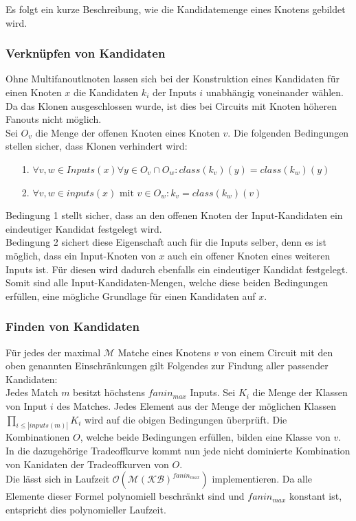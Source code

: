 \documentclass[11pt, a4paper, german]{article}
\begin{document}
Es folgt ein kurze Beschreibung, wie die Kandidatemenge eines Knotens gebildet wird.

\subsubsection{Verknüpfen von Kandidaten}
\label{subsubsec:verknuepfen_kandidaten}
Ohne Multifanoutknoten lassen sich bei der Konstruktion eines Kandidaten für einen Knoten $x$ die Kandidaten $k_i$ der Inputs $i$ unabhängig voneinander wählen.
Da das Klonen ausgeschlossen wurde, ist dies bei Circuits mit Knoten höheren Fanouts nicht möglich.\\
Sei $O_v$ die Menge der offenen Knoten eines Knoten $v$.
Die folgenden Bedingungen stellen sicher, dass Klonen verhindert wird: \\
\begin{itemize}
	\item[1.] $\forall v,w \in Inputs(x) \forall y \in O_v \cap O_w : class(k_v)(y) = class(k_w)(y)$
	\item[2.] $\forall v,w \in inputs(x) \text{ mit } v \in O_w : k_v = class(k_w)(v)$
\end{itemize}
Bedingung 1 stellt sicher, dass an den offenen Knoten der Input-Kandidaten ein eindeutiger Kandidat festgelegt wird.\\ Bedingung 2 sichert diese Eigenschaft auch für die Inputs selber, denn es ist möglich, dass ein Input-Knoten von $x$ auch ein offener Knoten eines weiteren Inputs ist. Für diesen wird dadurch ebenfalls ein eindeutiger Kandidat festgelegt. \\
Somit sind alle Input-Kandidaten-Mengen, welche diese beiden Bedingungen erfüllen, eine mögliche Grundlage für einen Kandidaten auf $x$. 

\subsubsection{Finden von Kandidaten} 
Für jedes der maximal $\mathcal{M}$ Matche eines Knotens $v$ von einem Circuit mit den oben genannten Einschränkungen gilt Folgendes zur Findung aller passender Kandidaten:\\

Jedes Match $m$ besitzt höchstens $fanin_{max}$ Inputs. Sei $K_i$ die Menge der Klassen von Input $i$ des Matches. Jedes Element aus der Menge der möglichen Klassen $\prod_{i\leq |inputs(m)|} K_i $ wird auf die obigen Bedingungen überprüft. Die Kombinationen $O$, welche beide Bedingungen erfüllen, bilden eine Klasse von $v$. In die  dazugehörige Tradeoffkurve kommt nun jede nicht dominierte Kombination von Kanidaten der Tradeoffkurven von $O$. \\
Die lässt sich in Laufzeit $\mathcal{O}(\mathcal{M}(\mathcal{KB})^{fanin_{max}} )$ implementieren. Da alle Elemente dieser Formel polynomiell beschränkt sind und $fanin_{max}$ konstant ist, entspricht dies polynomieller Laufzeit.
 
\end{document}

